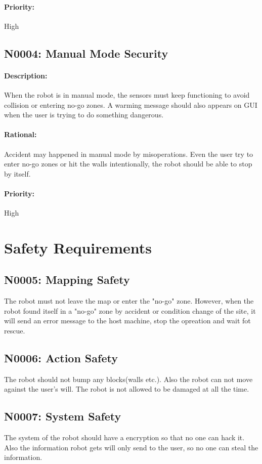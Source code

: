 \documentclass[11pt, a4paper]{report}
\begin{document}
\paragraph{Priority:}
High

\subsection{N0004: Manual Mode Security}
\paragraph{Description:}
When the robot is in manual mode, the sensors must keep functioning to avoid collision or entering no-go zones. A warming message should also appears on GUI when the user is trying to do something dangerous.
\paragraph{Rational:}
Accident may happened in manual mode by misoperations. Even the user try to enter no-go zones or hit the walls intentionally, the robot should be able to stop by itself.
\paragraph{Priority:}
High 

\section{Safety Requirements}
\subsection{N0005: Mapping Safety}
The robot must not leave the map or enter the "no-go" zone. However, when the robot found itself in a "no-go" zone by accident or condition change of the site, it will send an error message to the host machine, stop the opreation and wait fot rescue.



\subsection{N0006: Action Safety}
The robot should not bump any blocks(walls etc.). Also the robot can not move against the user's will.  The robot is not allowed to be damaged at all the time.


\subsection{N0007: System Safety}
The system of the robot should have a encryption so that no one can hack it. Also the information robot gets will only send to the user, so no one can steal the information.
\end{document}
